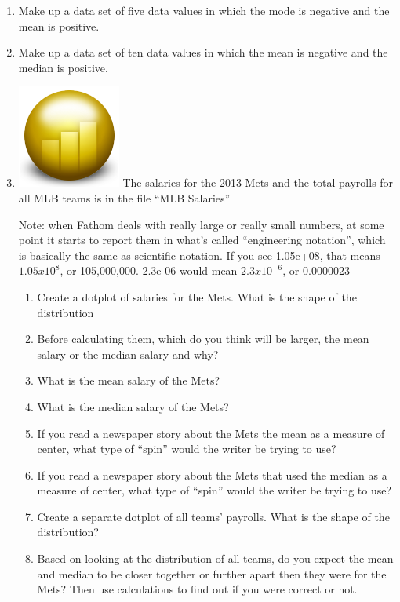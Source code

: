 \documentclass[12pt]{article}
\theoremstyle{plain}     %
\begin{document}
\begin{enumerate}
	\item Make up a data set of five data values in which the mode is negative and the mean is positive.


	\item Make up a data set of ten data values in which the mean is negative and the median is positive.


	\item \includegraphics[scale=.1]{fathom.png} The salaries for the 2013 Mets and the total payrolls for all MLB teams is in the file “MLB Salaries”

Note: when Fathom deals with really large or really small numbers, at some point it starts to report them in what’s called “engineering notation”, which is basically the same as scientific notation.  If you see 1.05e+08, that means $1.05 x 10^8$, or 105,000,000.  2.3e-06 would mean $2.3 x 10^{-6}$, or 0.0000023

	\begin{enumerate}
		\item Create a dotplot of salaries for the Mets.  What is the shape of the distribution
		\item Before calculating them, which do you think will be larger, the mean salary or the median salary and why?
		\item What is the mean salary of the Mets?  
		\item What is the median salary of the Mets?   
		\item If you read a newspaper story about the Mets the mean as a measure of center, what type of “spin” would the writer be trying to use?
		\item If you read a newspaper story about the Mets that used the median as a measure of center, what type of “spin” would the writer be trying to use?
		\item Create a separate dotplot of all teams’ payrolls.  What is the shape of the distribution?  
		\item Based on looking at the distribution of all teams, do you expect the mean and median to be closer together or further apart then they were for the Mets?  Then use calculations to find out if you were correct or not.
\end{enumerate}	 
	
\end{enumerate}
	
\end{document}
